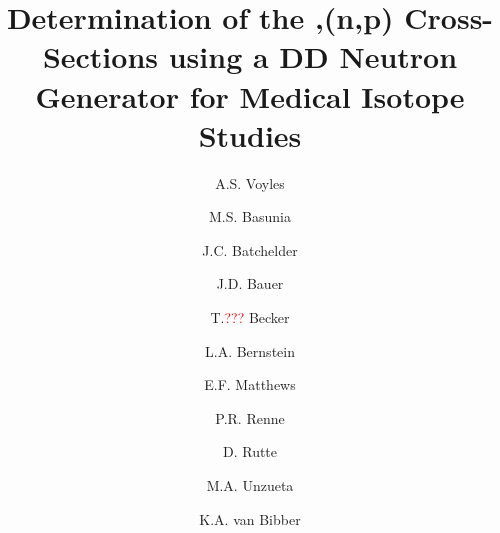 \documentclass[5p]{elsarticle}
\begin{document}
\begin{frontmatter}


\title{Determination of the ,(n,p) Cross-Sections using a DD Neutron Generator for Medical Isotope Studies}




\author[ucb]{A.S. Voyles }

\author[lbl]{M.S. Basunia}

\author[lbl]{J.C. Batchelder}

\author[llnl]{J.D. Bauer}

\author[geo,eps]{T.\textcolor{red}{???} Becker}


\author[ucb,lbl]{L.A. Bernstein}


\author[ucb]{E.F. Matthews}

\author[geo,eps]{P.R. Renne}

\author[geo,eps]{D. Rutte}

\author[ucb]{M.A. Unzueta}

\author[ucb]{K.A. van Bibber}








\end{frontmatter}
\end{document}

